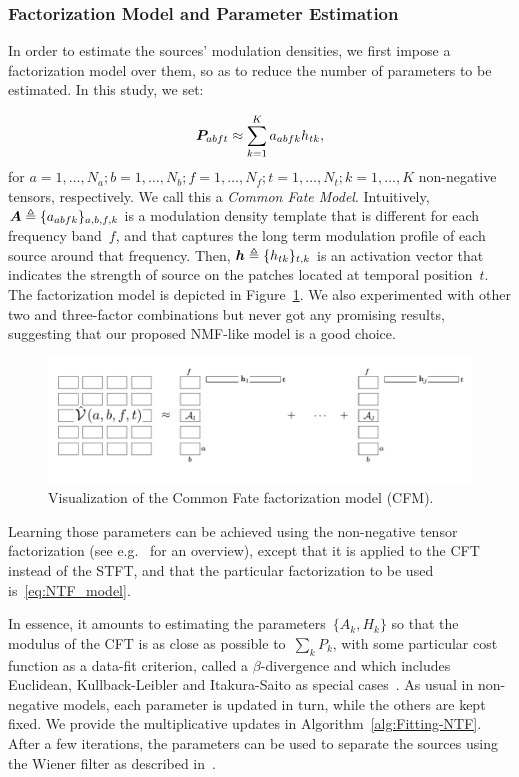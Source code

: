 \subsubsection{Factorization Model and Parameter Estimation}
\label{sub:NTF}

In order to estimate the sources' modulation densities, we first impose
a factorization model over them, so as to reduce the number of parameters
to be estimated. In this study, we set:

\begin{equation}
{\bm{P}}_{abft} \approx \sum_{k=1}^{K}a_{abfk}h_{tk},\label{eq:NTF_model}
\end{equation}
for  $a=1,\ldots,N_a;b=1,\ldots,N_b;f=1,\ldots,N_f;t=1,\ldots,N_t;k=1,\ldots,K$
non-negative tensors, respectively. We call this a \emph{Common Fate
Model}. Intuitively, ${\bm{A}} \triangleq \{a_{abfk}\}_{a,b,f,k}$ is a modulation density template that
is different for each frequency band~$f$, and that captures the
long term modulation profile of each source around that frequency.
Then, ${\bm{h}} \triangleq \{h_{tk}\}_{t,k}$ is an activation vector that indicates the strength
of source on the patches located at temporal position~$t$.
The factorization model is depicted in Figure~\ref{fig:cfm}.
We also experimented with other two and three-factor combinations but never got any promising results, suggesting that our proposed NMF-like model is a good choice.

\begin{figure}[!htbp]
\centering
\includegraphics[width=0.9\columnwidth]{Chapters/06_Separation_Unknown/figures/cfm.pdf}
\caption{Visualization of the Common Fate factorization model (CFM).}
\label{fig:cfm}
\end{figure}

Learning those parameters can be achieved using the non-negative
tensor factorization (see e.g.~\cite{cichoki09,ozerov12,smaragdis14}
for an overview), except that it is applied to the CFT instead of the STFT,
and that the particular factorization to be used is~\eqref{eq:NTF_model}.

In essence, it amounts to estimating the parameters~$\{ A_{k},H_{k}\} $
so that the modulus of the CFT is
as close as possible to~$\sum_{k}P_{k}$, with some particular
cost function as a data-fit criterion, called a $\beta$-divergence
and which includes Euclidean, Kullback-Leibler and Itakura-Saito as
special cases~\cite{fitzgerald08a}. As usual in non-negative models,
each parameter is updated in turn, while the others are kept fixed.
We provide the multiplicative updates in Algorithm~\ref{alg:Fitting-NTF}.
After a few iterations, the parameters can be used to separate the sources using the Wiener filter as described in~\cite{liutkus15}.

